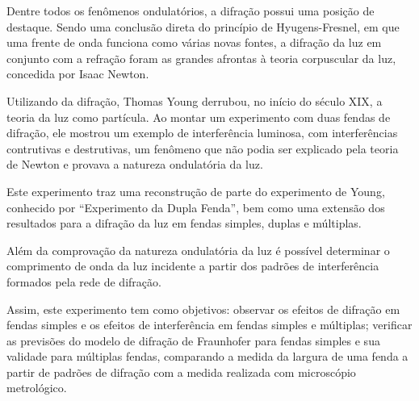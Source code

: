 Dentre todos os fenômenos ondulatórios, a difração possui uma posição de destaque. Sendo uma conclusão direta do princípio de Hyugens-Fresnel, em que uma frente de onda funciona como várias novas fontes, a difração da luz em conjunto com a refração foram as grandes afrontas à teoria corpuscular da luz, concedida por Isaac Newton.

Utilizando da difração, Thomas Young derrubou, no início do século XIX, a teoria da luz como partícula. Ao montar um experimento com duas fendas de difração, ele mostrou um exemplo de interferência luminosa, com interferências contrutivas e destrutivas, um fenômeno que não podia ser explicado pela teoria de Newton e provava a natureza ondulatória da luz.

Este experimento traz uma reconstrução de parte do experimento de Young, conhecido por “Experimento da Dupla Fenda”, bem como uma extensão dos resultados para a difração da luz em fendas simples, duplas e múltiplas.

Além da comprovação da natureza ondulatória da luz é possível determinar o comprimento de onda da luz incidente a partir dos padrões de interferência formados pela rede de difração.

Assim, este experimento tem como objetivos: observar os efeitos de difração em fendas simples e os efeitos de interferência em fendas simples e múltiplas; verificar as previsões do modelo de difração de Fraunhofer para fendas simples e sua validade para múltiplas fendas, comparando a medida da largura de uma fenda a partir de padrões de difração com a medida realizada com microscópio metrológico.

